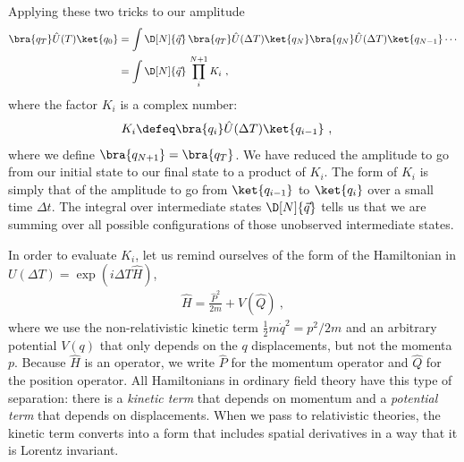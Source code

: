 Applying these two tricks to our amplitude 
\begin{align}
    \bra{q_T} \hat U(T) \ket{q_0} 
    &= \int \D[N]{\vec{q}} \,
    \bra{q_T} \hat U(\Delta T) \ket{q_N}
    \bra{q_N}\hat U(\Delta T) \ket{q_{N-1}}\cdots 
    \\
    &=\int \D[N]{\vec{q}} \,
    \prod_i^{N+1} K_i \ , \label{eq:path:integral:time:evolution:product:of:Ks}
\end{align}
where the factor $K_i$ is a complex number:
\begin{align}
    K_i &\defeq \bra{q_{i}} \hat U(\Delta T) \ket{q_{i-1}} \ ,
\end{align}
where we define $\bra{q_{N+1}} = \bra{q_T}$. We have reduced the amplitude to go from our initial state to our final state to a product of $K_i$. The form of $K_i$ is simply that of the amplitude to go from $\ket{q_{i-1}}$ to $\ket{q_{i}}$ over a small time $\Delta t$. The integral over intermediate states $\D[N]{\vec{q}}$ tells us that we are summing over all possible configurations of those unobserved intermediate states. 

In order to evaluate $K_i$, let us remind ourselves of the form of the Hamiltonian in $U(\Delta T) = \exp(i\Delta T\hat H)$,
\begin{align}
    \hat H = \frac{\hat P^2}{2m} + V(\hat Q) \ ,
\end{align}
where we use the non-relativistic kinetic term $\frac{1}{2}m\dot q^2 = p^2/2m$ and an arbitrary potential $V(q)$ that only depends on the $q$ displacements, but not the momenta $p$. Because $\hat H$ is an operator, we write $\hat P$ for the momentum operator and $\hat Q$ for the position operator. All Hamiltonians in ordinary field theory have this type of separation: there is a \emph{kinetic term} that depends on momentum and a \emph{potential term} that depends on displacements. When we pass to relativistic theories, the kinetic term converts into a form that includes spatial derivatives in a way that it is Lorentz invariant. 

